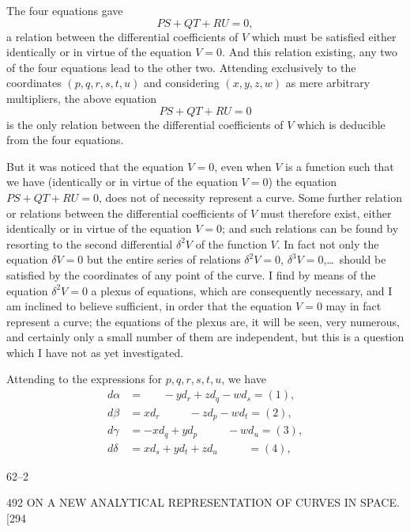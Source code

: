 \documentclass[11pt]{article}
\begin{document}
The four equations gave
\[ PS+QT+RU=0, \]
a relation between the differential coefficients of $V$ which must be satisfied either
identically or in virtue of the equation $V=0$. And this relation existing, any two
of the four equations lead to the other two. Attending exclusively to the coordinates
$(p,q,r,s,t,u)$ and considering $(x,y,z,w)$ as mere arbitrary multipliers, the above
equation
\[ PS+QT+RU=0 \]
is the only relation between the differential coefficients of $V$ which is deducible from
the four equations.

But it was noticed that the equation $V=0$, even when $V$ is a function such that
we have (identically or in virtue of the equation $V=0$) the equation $PS+QT+RU=0$,
does not of necessity represent a curve. Some further relation or relations between
the differential coefficients of $V$ must therefore exist, either identically or in virtue of
the equation $V=0$; and such relations can be found by resorting to the second
differential $\delta^{2}V$ of the function $V$. In fact not only the equation $\delta V=0$ but the
entire series of relations $\delta^{2}V=0$, $\delta^{3}V=0$,\ldots\ should be satisfied by the coordinates of
any point of the curve. I find by means of the equation $\delta^{2}V=0$ a plexus of
equations, which are consequently necessary, and I am inclined to believe sufficient,
in order that the equation $V=0$ may in fact represent a curve; the equations of
the plexus are, it will be seen, very numerous, and certainly only a small number of
them are independent, but this is a question which I have not as yet investigated.

Attending to the expressions for $p,q,r,s,t,u$, we have
\[ \begin{aligned}
d\alpha &= \phantom{xd_{r}}\ -yd_{r}+zd_{q}-wd_{s} = (1),\\
d\beta &= xd_{r}\ \phantom{-yd_{r}}\ -zd_{p}-wd_{t} = (2),\\
d\gamma &= -xd_{q}+yd_{p}\ \phantom{-zd_{p}}\ -wd_{u} = (3),\\
d\delta &= xd_{s}+yd_{t}+zd_{u}\ \phantom{-wd_{u}} = (4),
\end{aligned} \]

\medskip
\hfill 62--2\hfill\hfill

\newpage
\begin{center}
492 \hfill ON A NEW ANALYTICAL REPRESENTATION OF CURVES IN SPACE. \hfill \textsc{[294}
\end{center}
\end{document}

